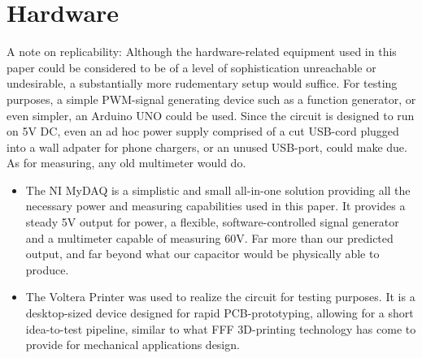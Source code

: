 \section{Hardware}
A note on replicability: Although the hardware-related equipment used in this paper could be considered to be of a level of sophistication unreachable or undesirable, a substantially more rudementary setup would suffice. For testing purposes, a simple PWM-signal generating device such as a function generator, or even simpler, an Arduino UNO \cite{abhi} could be used. Since the circuit is designed to run on 5V DC, even an ad hoc power supply comprised of a cut USB-cord plugged into a wall adpater for phone chargers, or an unused USB-port, could make due. As for measuring, any old multimeter would do.
\begin{itemize}
    \item The NI MyDAQ is a simplistic and small all-in-one solution providing all the necessary power and measuring capabilities used in this paper. It provides a steady 5V output for power, a flexible, software-controlled signal generator and a multimeter capable of measuring 60V\cite{mydaq}. Far more than our predicted output, and far beyond what our capacitor would be physically able to produce.
    \item The Voltera Printer was used to realize the circuit for testing purposes\cite{voltera}. It is a desktop-sized device designed for rapid PCB-prototyping, allowing for a short idea-to-test pipeline, similar to what FFF 3D-printing technology has come to provide for mechanical applications design.
\end{itemize}
